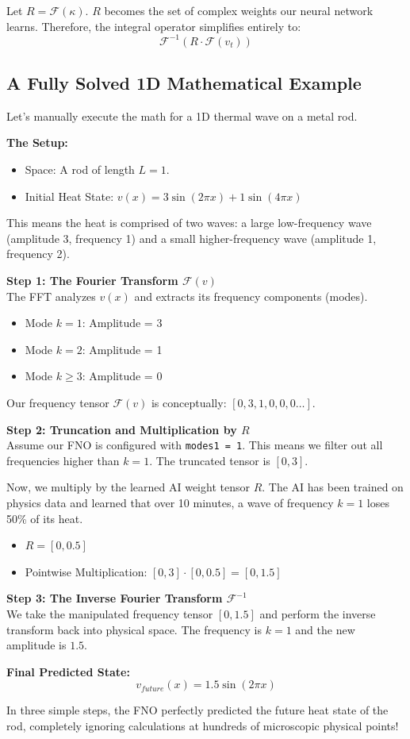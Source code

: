 \documentclass[12pt,a4paper]{article}
\begin{document}
Let $R = \mathcal{F}(\kappa)$. $R$ becomes the set of complex weights our neural network learns. Therefore, the integral operator simplifies entirely to:
\begin{equation}
\mathcal{F}^{-1} \left( R \cdot \mathcal{F}(v_t) \right)
\end{equation}

\subsection{A Fully Solved 1D Mathematical Example}
Let's manually execute the math for a 1D thermal wave on a metal rod.

\textbf{The Setup:}
\begin{itemize}
    \item Space: A rod of length $L = 1$.
    \item Initial Heat State: $v(x) = 3\sin(2\pi x) + 1\sin(4\pi x)$
\end{itemize}
This means the heat is comprised of two waves: a large low-frequency wave (amplitude 3, frequency 1) and a small higher-frequency wave (amplitude 1, frequency 2).

\textbf{Step 1: The Fourier Transform $\mathcal{F}(v)$}\\
The FFT analyzes $v(x)$ and extracts its frequency components (modes).
\begin{itemize}
    \item Mode $k=1$: Amplitude = 3
    \item Mode $k=2$: Amplitude = 1
    \item Mode $k \ge 3$: Amplitude = 0
\end{itemize}
Our frequency tensor $\mathcal{F}(v)$ is conceptually: $[0, 3, 1, 0, 0, 0\dots]$.

\textbf{Step 2: Truncation and Multiplication by $R$}\\
Assume our FNO is configured with \texttt{modes1 = 1}. This means we filter out all frequencies higher than $k=1$. The truncated tensor is $[0, 3]$.

Now, we multiply by the learned AI weight tensor $R$. The AI has been trained on physics data and learned that over 10 minutes, a wave of frequency $k=1$ loses 50\% of its heat.
\begin{itemize}
    \item $R = [0, 0.5]$
    \item Pointwise Multiplication: $[0, 3] \cdot [0, 0.5] = [0, 1.5]$
\end{itemize}

\textbf{Step 3: The Inverse Fourier Transform $\mathcal{F}^{-1}$}\\
We take the manipulated frequency tensor $[0, 1.5]$ and perform the inverse transform back into physical space. The frequency is $k=1$ and the new amplitude is $1.5$.

\textbf{Final Predicted State:}
\begin{equation}
v_{future}(x) = 1.5\sin(2\pi x)
\end{equation}

In three simple steps, the FNO perfectly predicted the future heat state of the rod, completely ignoring calculations at hundreds of microscopic physical points!
\end{document}
